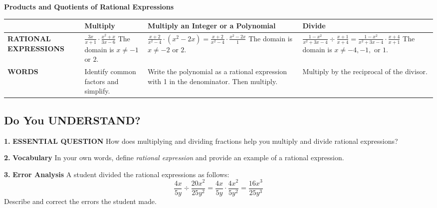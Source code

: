 \documentclass{article}
\newenvironment{concept-summary}{}{}
\newenvironment{practice}[2]{\textbf{#1.}}{\vspace{1em}}
\newcommand{\answer}[1]{}
\newcommand{\uncertain}[2]{#1}
\begin{document}
\begin{concept-summary}
\textbf{Products and Quotients of Rational Expressions}

\begin{tabular}{lp{4cm}p{4cm}p{4cm}}
\toprule
& \textbf{Multiply} & \textbf{Multiply an Integer or a Polynomial} & \textbf{Divide} \\
\midrule
\textbf{RATIONAL EXPRESSIONS} & 
$\frac{3x}{x+1} \cdot \frac{x^2+x}{3x-6}$ \newline The domain is $x \neq -1$ or $2$. & 
$\frac{x+2}{x^2-4} \cdot (x^2-2x) = \frac{x+2}{x^2-4} \cdot \frac{x^2-2x}{1}$ \newline The domain is $x \neq -2$ or $2$. & 
$\frac{1-x^2}{x^2+3x-4} \div \frac{x+1}{x+4} = \frac{1-x^2}{x^2+3x-4} \cdot \frac{x+4}{x+1}$ \newline The domain is $x \neq -4, -1, \text{ or } 1$. \\
\midrule
\textbf{WORDS} & 
Identify common factors and simplify. & 
Write the polynomial as a rational expression with 1 in the denominator. Then multiply. & 
Multiply by the reciprocal of the divisor. \\
\bottomrule
\end{tabular}
\end{concept-summary}

\subsection*{Do You UNDERSTAND?}

\begin{practice}{1}{\uncertain{?}{missing DOK}}
\textbf{ESSENTIAL QUESTION} How does multiplying and dividing fractions help you multiply and divide rational expressions?
\answer{}
\end{practice}

\begin{practice}{2}{\uncertain{?}{missing DOK}}
\textbf{Vocabulary} In your own words, define \textit{rational expression} and provide an example of a rational expression.
\answer{}
\end{practice}

\begin{practice}{3}{\uncertain{?}{missing DOK}}
\textbf{Error Analysis} A student divided the rational expressions as follows:
$$ \frac{4x}{5y} \div \frac{20x^2}{25y^2} = \frac{4x}{5y} \cdot \frac{4x^2}{5y^2} = \frac{16x^3}{25y^3} $$
Describe and correct the errors the student made.
\answer{}
\end{practice}
\end{document}
